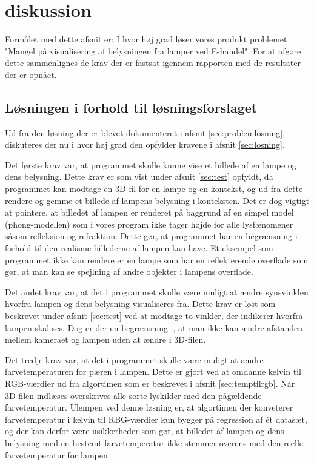 \section{diskussion}


Formålet med dette afsnit er: I hvor høj grad løser vores produkt problemet "Mangel på visualisering af belysningen fra lamper ved E-handel". For at afgøre dette sammenlignes de krav der er fastsat igennem rapporten med de resultater der er opnået. 

\subsection{Løsningen i forhold til løsningsforslaget}

Ud fra den løsning der er blevet dokumenteret i afsnit \ref{sec:problemlosning}, diskuteres der nu i hvor høj grad den opfylder kravene i afsnit \ref{sec:losning}. 

Det første krav var, at programmet skulle kunne vise et billede af en lampe og dens belysning. Dette krav er som vist under afsnit \ref{sec:test} opfyldt, da programmet kan modtage en 3D-fil for en lampe og en kontekst, og ud fra dette rendere og gemme et billede af lampens belysning i konteksten. Det er dog vigtigt at pointere, at billedet af lampen er renderet på baggrund af en simpel model (phong-modellen) som i vores program ikke tager højde for alle lysfænomener såsom refleksion og refraktion. Dette gør, at programmet har en begrænsning i forhold til den realisme billederne af lampen kan have. Et eksempel som programmet ikke kan rendere er en lampe som har en reflekterende overflade som gør, at man kan se spejlning af andre objekter i lampens overflade.  

Det andet krav var, at det i programmet skulle være muligt at ændre synsvinklen hvorfra lampen og dens belysning visualiseres fra. Dette krav er løst som beskrevet under afsnit \ref{sec:test} ved at modtage to vinkler, der indikerer hvorfra lampen skal ses. Dog er der en begrænsning i, at man ikke kan ændre afstanden mellem kameraet og lampen uden at ændre i 3D-filen. 

Det tredje krav var, at det i programmet skulle være muligt at ændre farvetemperaturen for pæren i lampen. Dette er gjort ved at omdanne kelvin til RGB-værdier ud fra algortimen som er beskrevet i afsnit \ref{sec:temptilrgb}. Når 3D-filen indlæses overskrives alle sorte lyskilder med den pågældende farvetemperatur. Ulempen ved denne løsning er, at algortimen der konveterer farvetemperatur i kelvin til RBG-værdier kun bygger på regression af ét datasæt, og der kan derfor være usikkerheder som gør, at billedet af lampen og dens belysning med en bestemt farvetemperatur ikke stemmer overens med den reelle farvetemperatur for lampen. 

